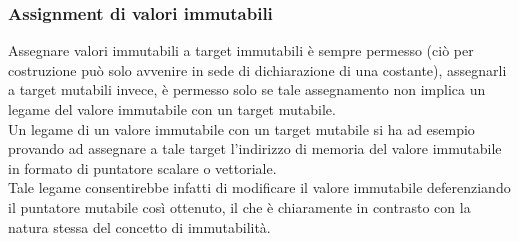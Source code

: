 \subsubsection{Assignment di valori immutabili}
Assegnare valori immutabili a target immutabili è sempre permesso 
(ciò per costruzione può solo avvenire in sede di dichiarazione di una costante), 
assegnarli a target mutabili invece, è permesso solo se tale assegnamento non implica un legame
del valore immutabile con un target mutabile. \\

Un legame di un valore immutabile con un target mutabile si ha ad esempio provando ad assegnare
a tale target l'indirizzo di memoria del valore immutabile in formato di puntatore scalare 
o vettoriale. \\

Tale legame consentirebbe infatti di modificare il valore immutabile deferenziando il puntatore 
mutabile così ottenuto, il che è chiaramente in contrasto con la natura stessa del concetto di 
immutabilità. \\